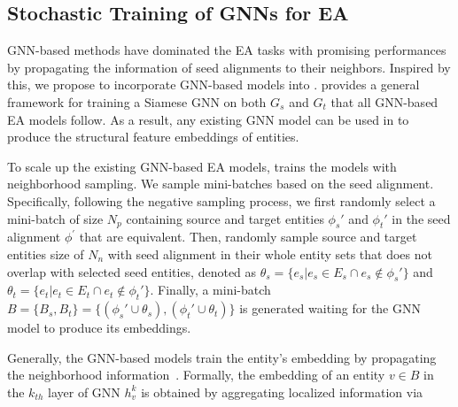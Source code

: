 \subsection{Stochastic Training of GNNs for EA}
\label{sec:mini-batch-training}

GNN-based methods \cite{AttrGNN20,KECG19, EVA20, AliNet20, DualAMN21} have dominated the EA tasks with promising performances by propagating the information of seed alignments to their neighbors.
Inspired by this, we propose to incorporate GNN-based models into \ClusterEA{}.
\ClusterEA{} provides a general framework for training a Siamese GNN on both $G_s$ and $G_t$ that all GNN-based EA models follow. As a result, any existing GNN model can be used in \ClusterEA{} to produce the structural feature embeddings of entities.

To scale up the existing GNN-based EA models, \ClusterEA{} trains the models with neighborhood sampling. We sample mini-batches based on the seed alignment. Specifically, following the negative sampling process, we first randomly select a mini-batch of size $N_p$ containing source and target entities $\phi_s'$ and $\phi_t'$ in the seed alignment $\phi^{\prime}$ that are equivalent. Then, randomly sample source and target entities size of $N_n$ with seed alignment in their whole entity sets that does not overlap with selected seed entities, denoted as $\theta_s = \{e_s |e_s \in E_s \cap e_s \not\in \phi_s'\}$ and $\theta_t = \{e_t |e_t \in E_t \cap e_t \not\in \phi_t'\}$. Finally, a mini-batch $B = \{B_s, B_t\} = \{(\phi_s' \cup \theta_s), (  \phi_t' \cup \theta_t) \}$ is generated waiting for the GNN model to produce its embeddings.

Generally, the GNN-based models train the entity's embedding by propagating the neighborhood information~\cite{RREA20, GCN17, GAT18}.
Formally, the embedding of an entity $v \in B$ in the $k_{th}$ layer of GNN $h_v^k$ is obtained by aggregating localized information via

